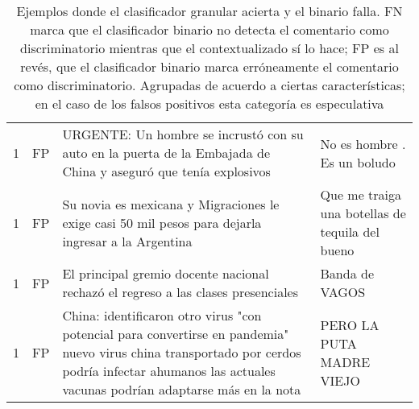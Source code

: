\begin{table}[ht!]
\begin{tabular}{p{} p{} p{} p{}}
        1 & FP & URGENTE: Un hombre se incrustó con su auto en la puerta de la Embajada de China y aseguró que tenía explosivos & No es hombre . Es un boludo \\
        1 & FP & Su novia es mexicana y Migraciones le exige casi 50 mil pesos para dejarla ingresar a la Argentina &  Que me traiga una botellas de tequila del bueno \\
        1 & FP & El principal gremio docente nacional rechazó el regreso a las clases presenciales &Banda de VAGOS \\
        1 & FP & China: identificaron otro virus "con potencial para convertirse en pandemia" nuevo virus china transportado por cerdos podría infectar ahumanos las actuales vacunas podrían adaptarse más en la nota & PERO LA PUTA MADRE VIEJO \\
    \end{tabular}
    \caption{Ejemplos donde el clasificador granular acierta y el binario falla. FN marca que el clasificador binario no detecta el comentario como discriminatorio mientras que el contextualizado sí lo hace; FP es al revés, que el clasificador binario marca erróneamente el comentario como discriminatorio. Agrupadas de acuerdo a ciertas características; en el caso de los falsos positivos esta categoría es especulativa}
    \label{tab:fine_vs_plain_comparison}
\end{table}